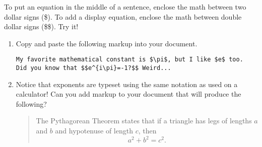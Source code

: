 To put an equation in the middle of a sentence, enclose the math between
two dollar signs (\$). To add a display equation, enclose the math
between double dollar signs (\$\$). Try it!

\begin{enumerate}
\item Copy and paste the following markup into your document.
\bigskip

\begin{codeblock}
\begin{verbatim}
My favorite mathematical constant is $\pi$, but I like $e$ too.
Did you know that $$e^{i\pi}=-1?$$ Weird...
\end{verbatim}
\end{codeblock}
\bigskip

\item Notice that exponents are typeset using the same notation as used
on a calculator! Can you add markup to your document that will produce
the following?

\begin{quote}
The Pythagorean Theorem states that if a triangle has legs of lengths
$a$ and $b$ and hypotenuse of length $c$, then
\[
a^{2}+b^{2}=c^{2}.
\]
\end{quote}

\end{enumerate}
